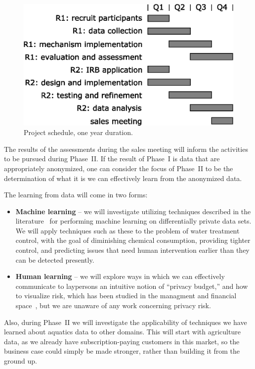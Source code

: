 \begin{figure}[h]
 \center
\includegraphics[width=0.6\columnwidth]{gantt}
    \caption{Project schedule, one year duration.}
    \label{fig:gantt}
\end{figure}

The results of the assessments during the sales meeting will inform
the activities to be pursued during Phase~II.
If the result of Phase~I is data that are appropriately anonymized,
one can consider the focus of Phase~II to be the determination of
what it is we can effectively learn from the anonymized data.

The learning from data will come in two forms:
\begin{itemize}
\item {\bf Machine learning} -- we will investigate utilizing techniques
described in the literature~\cite{acgmmtz16,fs10,ss15} for performing machine
learning on differentially private data sets.
We will apply techniques such as these to the problem of water treatment
control, with the goal of diminishing chemical consumption, providing
tighter control, and predicting issues that need human intervention
earlier than they can be detected presently.
\item {\bf Human learning} -- we will explore ways in which we can effectively
communicate to laypersons an intuitive notion of ``privacy budget,'' and
how to visualize risk, which has been studied in the
managment and
financial space~\cite{Eppler09,Sarlin16}, but we are unaware of any
work concerning privacy risk.
\end{itemize}

Also, during Phase~II we will investigate the applicability of techniques
we have learned about aquatics data to other domains.  This will start with
agriculture data, as we already have subscription-paying customers in
this market, so the business case could simply be made stronger, rather
than building it from the ground up.
